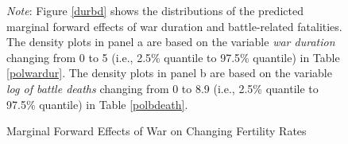\documentclass [12pt] {article}
\renewcommand{\footnotesize}{\scriptsize} %
\begin{document}
\begin{figure}[h]
  \begin{flushleft}  
        {\footnotesize {\it Note}: Figure \ref{durbd} shows the distributions of the predicted marginal forward effects of war duration and battle-related fatalities. The density plots in panel a are based on the variable {\it war duration} changing from 0 to 5 (i.e., 2.5\% quantile to 97.5\% quantile) %
 in Table \ref{polwardur}. The density plots in panel b are based on the variable {\it log of battle deaths} changing from 0 to 8.9 (i.e., 2.5\% quantile to 97.5\% quantile) %
 in Table \ref{polbdeath}.}
       \end{flushleft} 
\end{figure}

\begin{figure}[h]
   \centering
    \caption{Marginal Forward Effects of War on Changing Fertility Rates}
    \label{fig:fertility}

\end{figure}
\end{document}
